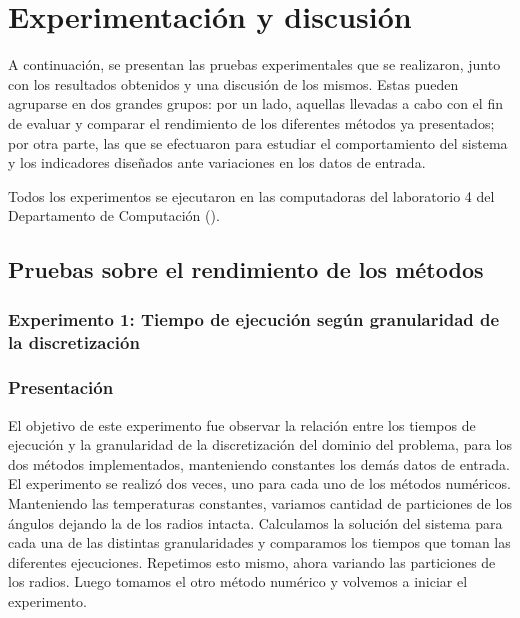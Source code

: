 \section{Experimentación y discusión}

  A continuación, se presentan las pruebas experimentales que se realizaron, junto con los resultados obtenidos y una discusión de los mismos. Estas pueden agruparse en dos grandes grupos: por un lado, aquellas llevadas a cabo con el fin de evaluar y comparar el rendimiento de los diferentes métodos ya presentados; por otra parte, las que se efectuaron para estudiar el comportamiento del sistema y los indicadores diseñados ante variaciones en los datos de entrada.

  Todos los experimentos se ejecutaron en las computadoras del laboratorio 4 del Departamento de Computación (). 

  \subsection{Pruebas sobre el rendimiento de los métodos}

    \subsubsection{Experimento 1: Tiempo de ejecución según granularidad de la discretización} 

      \subsubsection*{Presentación}
        El objetivo de este experimento fue observar la relación entre los tiempos de ejecución y la granularidad de la discretización del dominio del problema, para los dos métodos implementados, manteniendo constantes los demás datos de entrada. 
        El experimento se realizó dos veces, uno para cada uno de los métodos numéricos. Manteniendo las temperaturas constantes, variamos cantidad de particiones de los ángulos dejando la de los radios intacta. Calculamos la solución del sistema para cada una de las distintas granularidades y comparamos los tiempos que toman las diferentes ejecuciones. Repetimos esto mismo, ahora variando las particiones de los radios. Luego tomamos el otro método numérico y volvemos a iniciar el experimento. 

